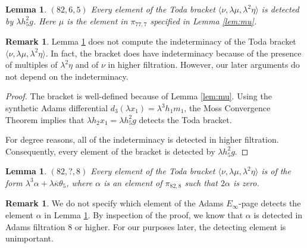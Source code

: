 \documentclass{amsart}
\newtheorem{lemma}[thm]{Lemma}
\theoremstyle{definition}
\newtheorem{rmk}[thm]{Remark}
\newcommand{\lemdeg}[1]{$({#1})$}
\newcommand{\kappabar}{\overline{\kappa}}
\begin{document}
\begin{lemma}
\label{lem:L^2eta,Lmu,nu}
\lemdeg{82, 6, 5}
Every element of the Toda bracket
$\langle \nu, \lambda \mu, \lambda^2 \eta \rangle$
is detected by $\lambda h_5^2 g$.
Here $\mu$ is the element in $\pi_{77,7}$ specified in
Lemma \ref{lem:mu}.
\end{lemma}


\begin{rmk}
Lemma \ref{lem:L^2eta,Lmu,nu} does not compute the indeterminacy
of the Toda bracket $\langle \nu, \lambda \mu, \lambda^2 \eta \rangle$.
In fact, the bracket does have indeterminacy because of the presence
of multiples of $\lambda^2 \eta$ and of $\nu$ in higher filtration.
However, our later arguments do not depend on the indeterminacy.
\end{rmk}

\begin{proof}
The bracket is well-defined because of
Lemma \ref{lem:mu}.
Using the synthetic Adams differential $d_3(\lambda x_1) = 
\lambda^3 h_1 m_1$,
the Moss Convergence Theorem \cite{BK21} \cite{Moss70} 
implies that $\lambda h_2 x_1 = \lambda h_5^2 g$ detects the Toda bracket.

For degree reasons, all of the indeterminacy is detected in higher
filtration.
Consequently, every element of the bracket is detected by $\lambda h_5^2 g$.
\end{proof}


\begin{lemma}
\label{lem:alpha}
\lemdeg{82, ?, 8}
Every element of the Toda bracket
$\langle \nu, \lambda \mu, \lambda^2 \eta \rangle$ is of the form
$\lambda^3 \alpha + \lambda \kappabar \theta_5$,
where $\alpha$ is an element of $\pi_{82,8}$ such that $2 \alpha$ is zero.
\end{lemma}

\begin{rmk}
We do not specify which element of the Adams $E_\infty$-page detects
the element $\alpha$ in Lemma \ref{lem:alpha}.  
By inspection of the proof, we know that $\alpha$ is detected in
Adams filtration $8$ or higher.
For our purposes later, 
the detecting element is unimportant.
\end{rmk}
\end{document}
